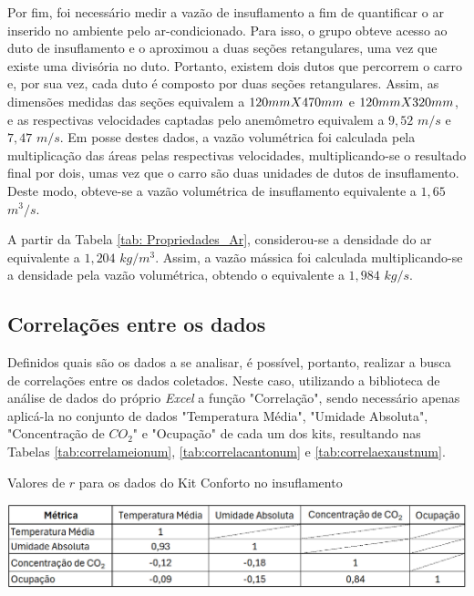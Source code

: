 \documentclass[acronym,symbols,table]{fei}
\begin{document}
Por fim, foi necessário medir a vazão de insuflamento a fim de quantificar o ar inserido no ambiente pelo ar-condicionado. Para isso, o grupo obteve acesso ao duto de insuflamento e o aproximou a duas seções retangulares, uma vez que existe uma divisória no duto. Portanto, existem dois dutos que percorrem o carro e, por sua vez, cada duto é composto por duas seções retangulares. Assim, as dimensões medidas das seções equivalem a $120 \space mm \space X \space  470 \space mm$ e $120 \space mm \space X \space  320 \space mm$, e as respectivas velocidades captadas pelo anemômetro equivalem a $9,52$ $m/s$ e $7,47$ $m/s$. Em posse destes dados, a vazão volumétrica foi calculada pela multiplicação das áreas pelas respectivas velocidades, multiplicando-se o resultado final por dois, umas vez que o carro são duas unidades de dutos de insuflamento. Deste modo, obteve-se a vazão volumétrica de insuflamento equivalente a $1,65$ $m^3/s$.

A  partir da Tabela \ref{tab: Propriedades_Ar}, considerou-se a densidade do ar equivalente a $1,204$ $kg/m^3$. Assim, a vazão mássica foi calculada multiplicando-se a densidade pela vazão volumétrica, obtendo o equivalente a $1,984$ $kg/s$. 

\subsection{Correlações entre os dados} \label{correlacoescoleta}

Definidos quais são os dados a se analisar, é possível, portanto, realizar a busca de correlações entre os dados coletados. Neste caso, utilizando a biblioteca de análise de dados do próprio \textit{Excel} a função "Correlação", sendo necessário apenas aplicá-la no conjunto de dados "Temperatura Média", "Umidade Absoluta", "Concentração de $CO_2$" e "Ocupação" de cada um dos kits, resultando nas Tabelas \ref{tab:correlameionum}, \ref{tab:correlacantonum} e \ref{tab:correlaexaustnum}. 

\begin{table}[!htb]
 \centering
    \caption{Valores de $r$ para os dados do Kit Conforto no insuflamento}
    \includegraphics[width=1\linewidth]{Tabelas/correlameionum2.png}
    \label{tab:correlameionum}
\end{table}
\end{document}
